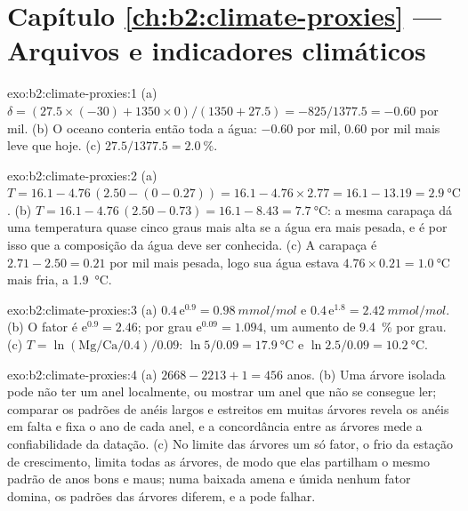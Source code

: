 \section*{Capítulo \ref{ch:b2:climate-proxies} --- Arquivos e indicadores climáticos}

\begin{solution}{exo:b2:climate-proxies:1}
(a) $\delta = (27.5 \times (-30) + 1350 \times 0)/(1350 + 27.5) = -825/1377.5 = -0.60$ por mil.
(b) O oceano conteria então toda a água: $-0.60$ por mil, \num{0.60} por mil mais leve que
hoje. (c) $27.5/1377.5 = \qty{2.0}{\percent}$.
\end{solution}

\begin{solution}{exo:b2:climate-proxies:2}
(a) $T = 16.1 - 4.76\,(2.50 - (0 - 0.27)) = 16.1 - 4.76 \times 2.77 = 16.1 - 13.19 =
\qty{2.9}{\celsius}$. (b) $T = 16.1 - 4.76\,(2.50 - 0.73) = 16.1 - 8.43 = \qty{7.7}{\celsius}$: a
mesma carapaça dá uma temperatura quase cinco graus mais alta se a água era mais pesada, e é por isso que
a composição da água deve ser conhecida. (c) A carapaça é $2.71 - 2.50 = 0.21$ por mil mais pesada,
logo sua água estava $4.76 \times 0.21 = \qty{1.0}{\celsius}$ mais fria, a \qty{1.9}{\celsius}.
\end{solution}

\begin{solution}{exo:b2:climate-proxies:3}
(a) $0.4\,\mathrm{e}^{0.9} = \qty{0.98}{mmol/mol}$ e $0.4\,\mathrm{e}^{1.8} =
\qty{2.42}{mmol/mol}$. (b) O fator é $\mathrm{e}^{0.9} = 2.46$; por grau $\mathrm{e}^{0.09}
= 1.094$, um aumento de \qty{9.4}{\percent} por grau. (c) $T = \ln(\text{Mg/Ca}/0.4)/0.09$:
$\ln 5/0.09 = \qty{17.9}{\celsius}$ e $\ln 2.5/0.09 = \qty{10.2}{\celsius}$.
\end{solution}

\begin{solution}{exo:b2:climate-proxies:4}
(a) $2668 - 2213 + 1 = 456$ anos. (b) Uma árvore isolada pode não ter um anel localmente, ou mostrar um anel
que não se consegue ler; comparar os padrões de anéis largos e estreitos em muitas árvores revela os
anéis em falta e fixa o ano de cada anel, e a concordância entre as árvores mede a
confiabilidade da datação. (c) No limite das árvores um só fator, o frio da estação de crescimento,
limita todas as árvores, de modo que elas partilham o mesmo padrão de anos bons e maus; numa baixada amena e
úmida nenhum fator domina, os padrões das árvores diferem, e a  pode falhar.
\end{solution}

